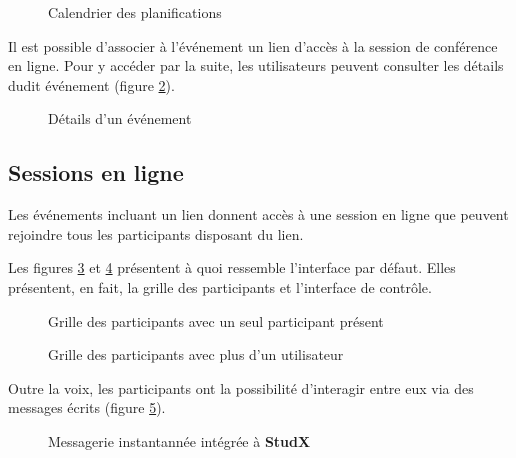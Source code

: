 \begin{figure}[h]
  \centering
  \caption{Calendrier des planifications}
  \label{fig:add_event}
\end{figure}

Il est possible d’associer à l'événement un lien d'accès à la session de conférence en ligne. 
Pour y accéder par la suite, les utilisateurs peuvent consulter les détails dudit événement (figure \ref{fig:event_details}).

\begin{figure}[h]
  \centering
  \caption{Détails d'un événement}
  \label{fig:event_details}
\end{figure}

\subsection{Sessions en ligne}
Les événements incluant un lien donnent accès à une session en ligne que
peuvent rejoindre tous les participants disposant du lien.

Les figures \ref{fig:single_user} et \ref{fig:many_users} présentent à quoi ressemble l’interface par défaut. 
Elles présentent, en fait, la grille des participants et l’interface de contrôle.


\begin{figure}[h]
  \centering
  \caption{Grille des participants avec un seul participant présent}
  \label{fig:single_user}
\end{figure}


\begin{figure}[h]
  \centering
  \caption{Grille des participants avec plus d'un utilisateur}
  \label{fig:many_users}
\end{figure}

\newpage
Outre la voix, les participants ont la possibilité d’interagir entre eux via des messages écrits (figure \ref{fig:room_chat}).

\begin{figure}[h]
  \centering
  \caption{Messagerie instantannée intégrée à \textbf{StudX}}
  \label{fig:room_chat}
\end{figure}

